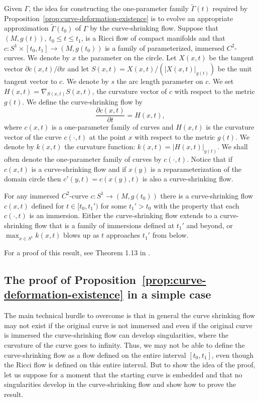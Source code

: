 Given $\Gamma$, the idea for constructing the one-parameter family
$\widetilde \Gamma(t)$ required by Proposition~\ref{prop:curve-deformation-existence} is to evolve
an appropriate approximation $\widetilde \Gamma(t_0)$ of $\Gamma$ by
the curve-shrinking flow. Suppose that $(M,g(t)),\ t_0\le t\le t_1$,
is a Ricci flow of compact manifolds and that $c\colon S^1\times
[t_0,t_1]\to (M,g(t_0))$ is a family of parameterized, immersed
$C^2$-curves. We denote by $x$ the parameter on the circle. Let
$X(x,t)$ be the tangent vector $\partial c(x,t)/\partial x$ and let
$S(x,t)=X(x,t)/(|X(x,t)|_{g(t)})$ be the unit tangent vector to $c$.
We denote by $s$ the arc length parameter on $c$. We set
$H(x,t)=\nabla _{S(x,t)}S(x,t)$, the curvature vector of $c$ with
respect to the metric $g(t)$.
 We define the curve-shrinking
flow by
$$\frac{\partial c(x,t)}{\partial t}=H(x,t),$$
where $c(x,t)$ is a one-parameter family of curves and $H(x,t)$ is
the curvature vector of the curve $c(\cdot,t)$ at the point $x$ with
respect to the metric $g(t)$. We denote by $k(x,t)$ the curvature
function: $k(x,t)=|H(x,t)|_{g(t)}$. We shall often denote the
one-parameter family of curves by $c(\cdot,t)$. Notice that if
$c(x,t)$ is a curve-shrinking flow and if $x(y)$ is a
reparameterization of the domain circle then $c'(y,t)=c(x(y),t)$ is
also a curve-shrinking flow.

\begin{claim}
\label{claim:curve-shrinking-short-time-existence}
\label{curvshrexist}
For any immersed $C^2$-curve $c\colon S^1\to (M,g(t_0))$ there is a
curve-shrinking flow $c(x,t)$ defined for $t\in [t_0,t_1')$ for some
$t_1'>t_0$ with the property that each $c(\cdot,t)$ is an immersion.
Either the curve-shrinking flow extends to a curve-shrinking flow
that is a family of immersions defined at $t_1'$ and beyond, or
$\max_{x\in S^1}k(x,t)$ blows up as $t$ approaches $t_1'$ from
below.
\end{claim}

For a proof of this result, see Theorem 1.13 in \cite{AG}.

\subsection{The proof of Proposition~{\ref{prop:curve-deformation-existence}} in a simple case}

The main technical hurdle to overcome is that in general the curve
shrinking flow may not exist if the original curve is not immersed
and even if the original curve is immersed the curve-shrinking flow
can develop singularities, where the curvature of the curve goes to
infinity. Thus, we may  not be able to define the curve-shrinking
flow as a flow defined on the entire interval $[t_0,t_1]$, even
though the Ricci flow is defined on this entire interval. But to
show the idea of the proof,  let us suppose for a moment that the
starting curve is embedded and that no singularities develop in the
curve-shrinking flow and show how to prove the result.

